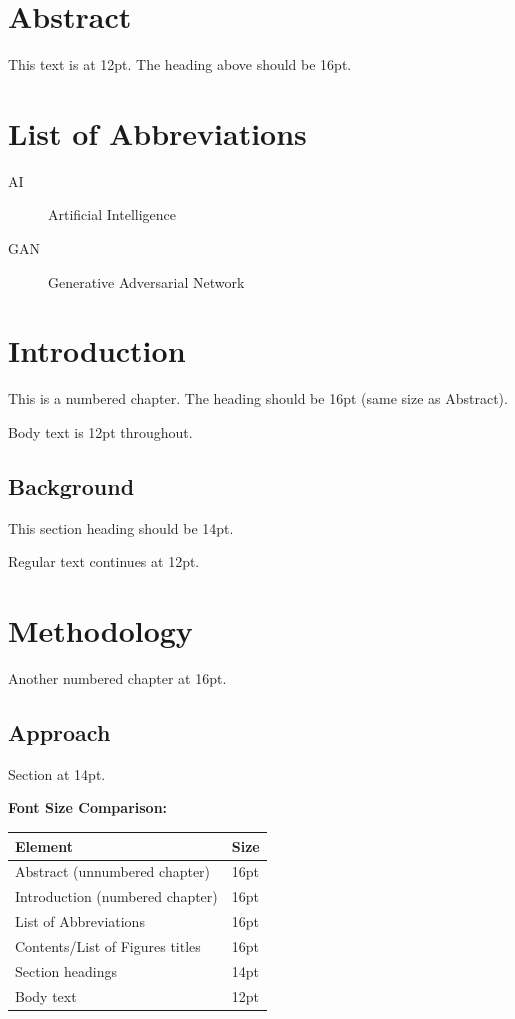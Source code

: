 \documentclass[12pt,oneside,a4paper]{report}
\begin{document}
\chapter*{Abstract}
This text is at 12pt. The heading above should be 16pt.

\chapter*{List of Abbreviations}
\begin{description}
\item[AI] Artificial Intelligence
\item[GAN] Generative Adversarial Network
\end{description}

\tableofcontents
\clearpage

\chapter{Introduction}
This is a numbered chapter. The heading should be 16pt (same size as Abstract).

Body text is 12pt throughout.

\section{Background}
This section heading should be 14pt.

Regular text continues at 12pt.

\clearpage

\chapter{Methodology}
Another numbered chapter at 16pt.

\section{Approach}
Section at 14pt.

\vspace{2cm}

\textbf{Font Size Comparison:}

\begin{tabular}{ll}
\textbf{Element} & \textbf{Size} \\
\hline
Abstract (unnumbered chapter) & 16pt \\
Introduction (numbered chapter) & 16pt \\
List of Abbreviations & 16pt \\
Contents/List of Figures titles & 16pt \\
Section headings & 14pt \\
Body text & 12pt \\
\end{tabular}
\end{document}
